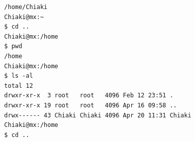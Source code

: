 \documentclass{article}
\begin{document}
\begin{verbatim}
  /home/Chiaki                                                                                                                                                                                                   
  Chiaki@mx:~                                                                                                                                                                                                    
  $ cd ..                                                                                                                                                                                                        
  Chiaki@mx:/home                                                                                                                                                                                                
  $ pwd                                                                                                                                                                                                          
  /home 
  Chiaki@mx:/home                                                                                                                                                                                                
  $ ls -al                                                                                                                                                                                                       
  total 12                                                                                                                                                                                                       
  drwxr-xr-x  3 root   root   4096 Feb 12 23:51 .                                                                                                                                                                
  drwxr-xr-x 19 root   root   4096 Apr 16 09:58 ..                                                                                                                                                               
  drwx------ 43 Chiaki Chiaki 4096 Apr 20 11:31 Chiaki                                                                                                                                                           
  Chiaki@mx:/home                                                                                                                                                                                                
  $ cd ..                                                                                                                                                                                                        

\end{verbatim}
\end{document}
